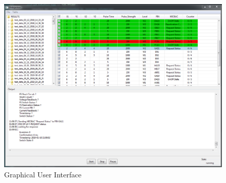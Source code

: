 \begin{figure}[H]
	\centering
	\includegraphics[width=1\textwidth, height=0.75\textwidth]{graphics/GUI.png}
	\caption{Graphical User Interface}
	\label{fig:pipeline}
\end{figure}